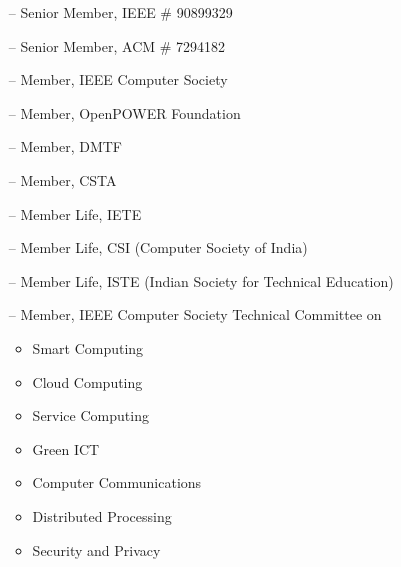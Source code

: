 \begin{itemize}
	\item[--] Senior Member, IEEE  \# 90899329
	\item[--]
	Senior Member, ACM  \#  7294182
	\item[--]
	Member, IEEE Computer Society 
	\item[--]
	Member, OpenPOWER Foundation 
	\item[--]
	Member, DMTF  
	\item[--]
	Member, CSTA
	\item[--]
	Member Life, IETE
	\item[--]
	Member Life, CSI (Computer Society of India) 
	\item[--]
	Member Life, ISTE (Indian Society for Technical Education) 
	\item[--]
	Member, IEEE Computer Society Technical Committee on 
\begin{itemize}
\item Smart Computing
\item Cloud Computing 
\item Service Computing
\item Green ICT
\item Computer Communications
\item Distributed Processing 
\item Security and Privacy
\end{itemize}	
\end{itemize}
